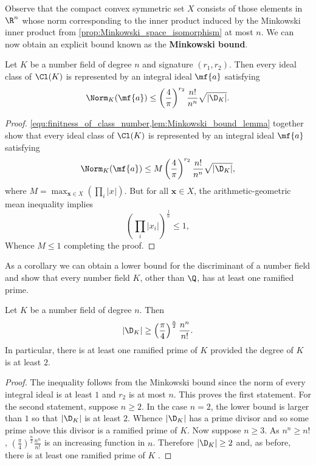 \documentclass[12pt]{article}
\begin{document}
      Observe that the compact convex symmetric set \(X\) consists of those elements in \(\R^{n}\) whose norm corresponding to the inner product induced by the Minkowski inner product from \cref{prop:Minkowski_space_isomorphism} at most \(n\). We can now obtain an explicit bound known as the \textbf{Minkowski bound}.

      \begin{theorem*}
        Let \(K\) be a number field of degree \(n\) and signature \((r_{1},r_{2})\). Then every ideal class of \(\Cl(K)\) is represented by an integral ideal \(\mf{a}\) satisfying
        \[
          \Norm_{K}(\mf{a}) \le \left(\frac{4}{\pi}\right)^{r_{2}}\frac{n!}{n^{n}}\sqrt{|\D_{K}|}.
        \]
      \end{theorem*}
      \begin{proof}
        \cref{equ:finitness_of_class_number,lem:Minkowski_bound_lemma} together show that every ideal class of \(\Cl(K)\) is represented by an integral ideal \(\mf{a}\) satisfying
        \[
          \Norm_{K}(\mf{a}) \le M\left(\frac{4}{\pi}\right)^{r_{2}}\frac{n!}{n^{n}}\sqrt{|\D_{K}|},
        \]
        where \(M = \max_{\mathbf{x} \in X}\left(\prod_{i}|x_{}|\right)\). But for all \(\mathbf{x} \in X\), the arithmetic-geometric mean inequality implies
        \[
          \left(\prod_{i}|x_{i}|\right)^{\frac{1}{n}} \le 1,
        \]
        Whence \(M \le 1\) completing the proof.
      \end{proof}

      As a corollary we can obtain a lower bound for the discriminant of a number field and show that every number field \(K\), other than \(\Q\), has at least one ramified prime.

      \begin{corollary}
        Let \(K\) be a number field of degree \(n\). Then
        \[
          |\D_{K}| \ge \left(\frac{\pi}{4}\right)^{\frac{n}{2}}\frac{n^{n}}{n!}.
        \]
        In particular, there is at least one ramified prime of \(K\) provided the degree of \(K\) is at least \(2\). 
      \end{corollary}
      \begin{proof}
        The inequality follows from the Minkowski bound since the norm of every integral ideal is at least \(1\) and \(r_{2}\) is at most \(n\). This proves the first statement. For the second statement, suppose \(n \ge 2\). In the case \(n = 2\), the lower bound is larger than \(1\) so that \(|\D_{K}|\) is at least \(2\). Whence \(|\D_{K}|\) has a prime divisor and so some prime above this divisor is a ramified prime of \(K\). Now suppose \(n \ge 3\). As \(n^{n} \ge n!\), \(\left(\frac{\pi}{4}\right)^{\frac{n}{2}}\frac{n^{n}}{n!}\) is an increasing function in \(n\). Therefore \(|\D_{K}| \ge 2\) and, as before, there is at least one ramified prime of \(K\) .
      \end{proof}
\end{document}
